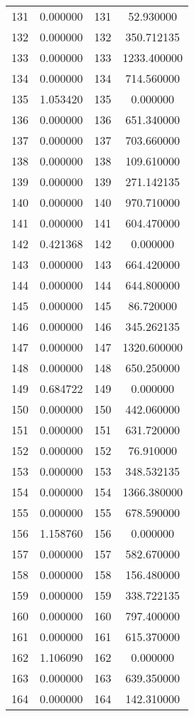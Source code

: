 \documentclass[12pt]{article}
\begin{document}
\begin{longtable}{@{}cccc@{}}
131 & 0.000000 & 131 & 52.930000 \\
132 & 0.000000 & 132 & 350.712135 \\
133 & 0.000000 & 133 & 1233.400000 \\
134 & 0.000000 & 134 & 714.560000 \\
135 & 1.053420 & 135 & 0.000000 \\
136 & 0.000000 & 136 & 651.340000 \\
137 & 0.000000 & 137 & 703.660000 \\
138 & 0.000000 & 138 & 109.610000 \\
139 & 0.000000 & 139 & 271.142135 \\
140 & 0.000000 & 140 & 970.710000 \\
141 & 0.000000 & 141 & 604.470000 \\
142 & 0.421368 & 142 & 0.000000 \\
143 & 0.000000 & 143 & 664.420000 \\
144 & 0.000000 & 144 & 644.800000 \\
145 & 0.000000 & 145 & 86.720000 \\
146 & 0.000000 & 146 & 345.262135 \\
147 & 0.000000 & 147 & 1320.600000 \\
148 & 0.000000 & 148 & 650.250000 \\
149 & 0.684722 & 149 & 0.000000 \\
150 & 0.000000 & 150 & 442.060000 \\
151 & 0.000000 & 151 & 631.720000 \\
152 & 0.000000 & 152 & 76.910000 \\
153 & 0.000000 & 153 & 348.532135 \\
154 & 0.000000 & 154 & 1366.380000 \\
155 & 0.000000 & 155 & 678.590000 \\
156 & 1.158760 & 156 & 0.000000 \\
157 & 0.000000 & 157 & 582.670000 \\
158 & 0.000000 & 158 & 156.480000 \\
159 & 0.000000 & 159 & 338.722135 \\
160 & 0.000000 & 160 & 797.400000 \\
161 & 0.000000 & 161 & 615.370000 \\
162 & 1.106090 & 162 & 0.000000 \\
163 & 0.000000 & 163 & 639.350000 \\
164 & 0.000000 & 164 & 142.310000 \\

\end{longtable}
\end{document}
